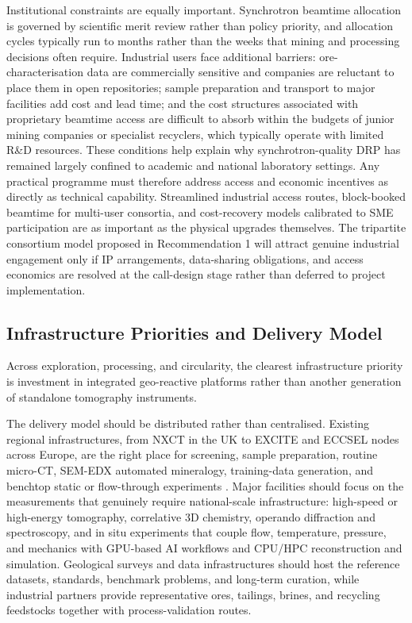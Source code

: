 \documentclass[12pt,a4paper]{article}
\begin{document}
Institutional constraints are equally important. Synchrotron beamtime allocation is governed by scientific merit review rather than policy priority, and allocation cycles typically run to months rather than the weeks that mining and processing decisions often require. Industrial users face additional barriers: ore-characterisation data are commercially sensitive and companies are reluctant to place them in open repositories; sample preparation and transport to major facilities add cost and lead time; and the cost structures associated with proprietary beamtime access are difficult to absorb within the budgets of junior mining companies or specialist recyclers, which typically operate with limited R\&D resources. These conditions help explain why synchrotron-quality DRP has remained largely confined to academic and national laboratory settings. Any practical programme must therefore address access and economic incentives as directly as technical capability. Streamlined industrial access routes, block-booked beamtime for multi-user consortia, and cost-recovery models calibrated to SME participation are as important as the physical upgrades themselves. The tripartite consortium model proposed in Recommendation 1 will attract genuine industrial engagement only if IP arrangements, data-sharing obligations, and access economics are resolved at the call-design stage rather than deferred to project implementation.

\subsection{Infrastructure Priorities and Delivery Model}
Across exploration, processing, and circularity, the clearest infrastructure priority is investment in integrated geo-reactive platforms rather than another generation of standalone tomography instruments.

The delivery model should be distributed rather than centralised. Existing regional infrastructures, from NXCT in the UK to EXCITE and ECCSEL nodes across Europe, are the right place for screening, sample preparation, routine micro-CT, SEM-EDX automated mineralogy, training-data generation, and benchtop static or flow-through experiments \cite{manchester_nxct_2026, excite_access_2026, eccsel_strath_xct_2026}. Major facilities should focus on the measurements that genuinely require national-scale infrastructure: high-speed or high-energy tomography, correlative 3D chemistry, operando diffraction and spectroscopy, and in situ experiments that couple flow, temperature, pressure, and mechanics with GPU-based AI workflows and CPU/HPC reconstruction and simulation. Geological surveys and data infrastructures should host the reference datasets, standards, benchmark problems, and long-term curation, while industrial partners provide representative ores, tailings, brines, and recycling feedstocks together with process-validation routes.
\end{document}
